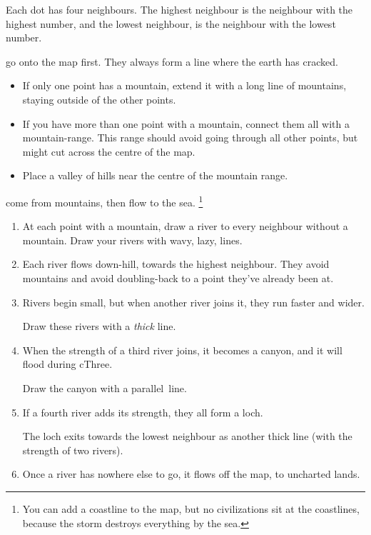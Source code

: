 \begin{multicols}{2}
Each dot has four neighbours.
The highest neighbour is the neighbour with the highest number, and the lowest neighbour, is the neighbour with the lowest number.

go onto the map first.
They always form a line where the earth has cracked.

\begin{itemize}
  \item
  If only one point has a mountain, extend it with a long line of mountains, staying outside of the other points.
  \item
  If you have more than one point with a mountain, connect them all with a mountain-range.
  This range should avoid going through all other points, but might cut across the centre of the map.
  \item
  Place a valley of hills near the centre of the mountain range.
\end{itemize}

\label{mapRivers}
come from mountains, then flow to the sea.%
\footnote{You can add a coastline to the map, but no civilizations sit at the coastlines, because the \gls{storm} destroys everything by the sea.}

\begin{enumerate}
  \item
  At each point with a mountain, draw a river to every neighbour without a mountain.
  Draw your rivers with wavy, lazy, lines.
  \item
  Each river flows down-hill, towards the highest neighbour.
  They avoid mountains and avoid doubling-back to a point they've already been at.
  \item
  Rivers begin small, but when another river joins it, they run faster and wider.

  Draw these rivers with a \emph{thick} line.
  \item
  When the strength of a third river joins, it becomes a canyon, and it will flood during \gls{cThree}.

  Draw the canyon with a parallel~line.
  \item
  If a fourth river adds its strength, they all form a loch.
  
  The loch exits towards the lowest neighbour as another thick line (with the strength of two rivers).
  \item
  Once a river has nowhere else to go, it flows off the map, to uncharted lands.
\end{enumerate}


\end{multicols}
